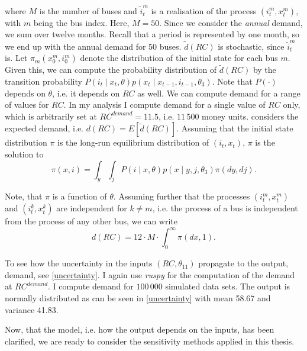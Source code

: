\noindent where $M$ is the number of buses and ${\tilde{i}}_t^m$ is a realisation of the process $(i_t^m, x_t^m)$, with $m$ being the bus index. Here, $M=50$. Since we consider the \textit{annual} demand, we sum over twelve months. Recall that a period is represented by one month, so we end up with the annual demand for 50 buses. $\tilde{d}(RC)$ is stochastic, since ${\tilde{i}}_t^m$ is. Let $\pi_m(x_0^m, i_0^m)$ denote the distribution of the initial state for each bus $m$. Given this, we can compute the probability distribution of $\tilde{d}(RC) $ by the transition probability $P(i_t \mid x_t, \theta)p(x_t \mid x_{t-1}, i_{t-1}, \theta_3) $. Note that $P(\cdot)$ depends on $\theta$, i.e. it depends on $RC$ as well. We can compute demand for a range of values for $RC$. In my analysis I compute demand for a single value of $RC$ only, which is arbitrarily set at $RC^{demand}=11.5$, i.e. $11\,500$ money units. \citet{R87} considers the expected demand, i.e. $d(RC)=E[\tilde{d}(RC)]$. Assuming that the initial state distribution $\pi$ is the long-run equilibrium distribution of $(i_t, x_t)$, $\pi$ is the solution to
\begin{equation*}
\pi(x, i)=\int_y \int_j P(i \mid x, \theta) p(x \mid y, j, \theta_3) \pi(dy, dj).
\end{equation*}

Note, that $\pi$ is a function of $\theta$. Assuming further that the processes $ (i_t^m, x_t^m)$ and $(i_t^k, x_t^k)$ are independent for $k \neq m$, i.e. the process of a bus is independent from the process of any other bus, we can write
\begin{equation*}
d(RC)=12 \cdot M \cdot \int_0^{\infty} \pi(dx, 1).
\end{equation*}

To see how the uncertainty in the inputs $(RC, \theta_{11})$ propagate to the output, demand, see \cref{uncertainty}. I again use \textit{ruspy} for the computation of the demand at $RC^{demand}$. I compute demand for $100\,000$ simulated data sets. The output is normally distributed as can be seen in \cref{uncertainty} with mean 58.67 and variance 41.83.

Now, that the model, i.e. how the output depends on the inputs, has been clarified, we are ready to consider the sensitivity methods applied in this thesis.
